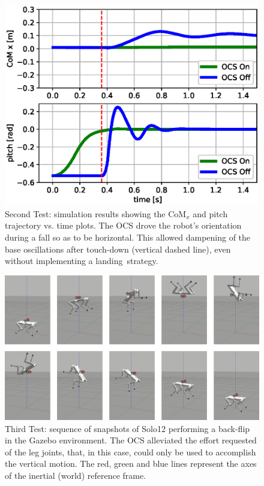 \documentclass[sensors,article,accept,pdftex,moreauthors]{Definitions/mdpi}
\begin{document}
\vspace{-8pt}
\begin{figure}[H]%
	 
	\includegraphics[width=.7\linewidth]{figures/fall_plot.eps}
	\caption{Second Test: simulation results showing the $\mathrm{CoM}_x$ and pitch trajectory vs. time plots. The OCS drove the robot's orientation during a fall so as to be horizontal. This allowed dampening of the base oscillations after touch-down (vertical dashed line), even without implementing a l\mbox{anding strat}egy.}
	\label{fig:fall_plot}
\end{figure}

\begin{figure}[H]%
 
	\includegraphics[width=\linewidth]{figures/backflip.png}
	\caption{{Third Test: sequence of snapshots of Solo12 performing a back-flip in the Gazebo environment. The OCS alleviated the effort requested of the leg joints, that, in this case, could only be used to accomplish the vertical motion. The red, green and blue lines represent the axes of the inertial (world) reference frame.}}
	\label{fig:backflip}
\end{figure}
\end{document}
